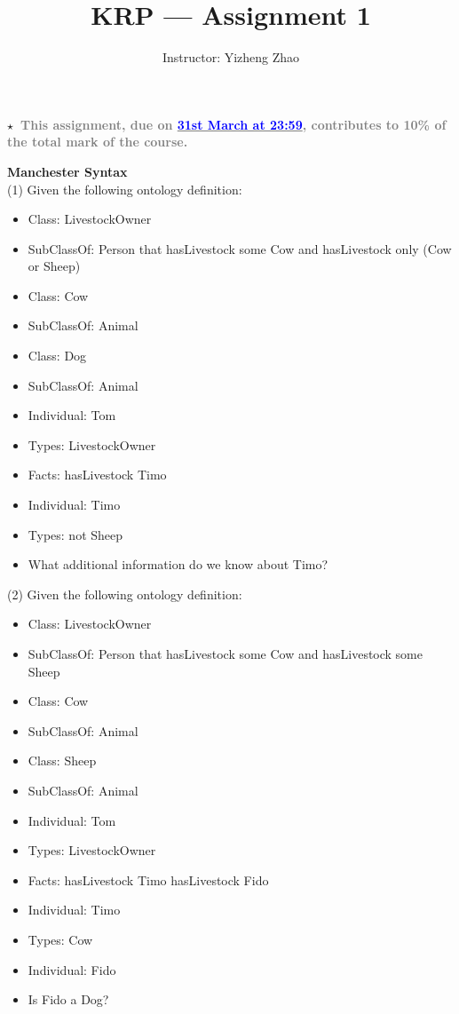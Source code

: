 \documentclass[12pt,a4paper]{article}
\newenvironment{problem}[2][{\color{red}Question}]{\begin{trivlist}
\item[\hskip \labelsep {\bfseries #1}\hskip \labelsep {\bfseries #2.}]}{\end{trivlist}}
\begin{document}
\title{{\color{blue}KRP --- Assignment 1}}
\author{Instructor: Yizheng Zhao}

 
\maketitle

\textbf{$\star$~\textcolor{gray}{This assignment, due on \underline{\textcolor{blue}{31st March at 23:59}}, contributes to 10\% of the total mark of the course.}}



\begin{problem}{{\color{red}1}}
\textbf{Manchester Syntax}\\
(1) Given the following ontology definition:
\begin{itemize}
\item[] Class: LivestockOwner
\item[] \quad SubClassOf: Person that hasLivestock some Cow and hasLivestock only (Cow or Sheep)
\item[] Class: Cow
\item[] \quad SubClassOf: Animal
\item[] Class: Dog
\item[] \quad SubClassOf: Animal
\item[] Individual: Tom
\item[] \quad Types: LivestockOwner
\item[] \quad Facts: hasLivestock Timo
\item[] Individual: Timo
\item[] \quad Types: not Sheep
\item What additional information do we know about Timo?
\end{itemize}


(2) Given the following ontology definition:
\begin{itemize}
\item[] Class: LivestockOwner
\item[] \quad SubClassOf: Person that hasLivestock some Cow and hasLivestock some Sheep
\item[] Class: Cow
\item[] \quad SubClassOf: Animal
\item[] Class: Sheep
\item[] \quad SubClassOf: Animal
\item[] Individual: Tom
\item[] \quad Types: LivestockOwner
\item[] \quad Facts: hasLivestock Timo hasLivestock Fido
\item[] Individual: Timo
\item[] \quad Types: Cow
\item[] Individual: Fido
\item Is Fido a Dog?
\end{itemize}



\end{problem}
\end{document}
